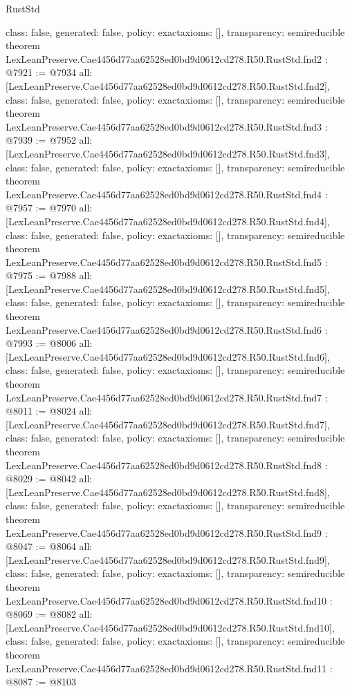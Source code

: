 \begin{lexlean}{RustStd}
\begin{coremodule}
{  class: false,
  generated: false,
  policy: exact{axioms: []},
  transparency: semireducible
}
theorem LexLeanPreserve.Cae4456d77aa62528ed0bd9d0612cd278.R50.RustStd.fnd2 : @7921 := @7934 {
  all: [LexLeanPreserve.Cae4456d77aa62528ed0bd9d0612cd278.R50.RustStd.fnd2],
  class: false,
  generated: false,
  policy: exact{axioms: []},
  transparency: semireducible
}
theorem LexLeanPreserve.Cae4456d77aa62528ed0bd9d0612cd278.R50.RustStd.fnd3 : @7939 := @7952 {
  all: [LexLeanPreserve.Cae4456d77aa62528ed0bd9d0612cd278.R50.RustStd.fnd3],
  class: false,
  generated: false,
  policy: exact{axioms: []},
  transparency: semireducible
}
theorem LexLeanPreserve.Cae4456d77aa62528ed0bd9d0612cd278.R50.RustStd.fnd4 : @7957 := @7970 {
  all: [LexLeanPreserve.Cae4456d77aa62528ed0bd9d0612cd278.R50.RustStd.fnd4],
  class: false,
  generated: false,
  policy: exact{axioms: []},
  transparency: semireducible
}
theorem LexLeanPreserve.Cae4456d77aa62528ed0bd9d0612cd278.R50.RustStd.fnd5 : @7975 := @7988 {
  all: [LexLeanPreserve.Cae4456d77aa62528ed0bd9d0612cd278.R50.RustStd.fnd5],
  class: false,
  generated: false,
  policy: exact{axioms: []},
  transparency: semireducible
}
theorem LexLeanPreserve.Cae4456d77aa62528ed0bd9d0612cd278.R50.RustStd.fnd6 : @7993 := @8006 {
  all: [LexLeanPreserve.Cae4456d77aa62528ed0bd9d0612cd278.R50.RustStd.fnd6],
  class: false,
  generated: false,
  policy: exact{axioms: []},
  transparency: semireducible
}
theorem LexLeanPreserve.Cae4456d77aa62528ed0bd9d0612cd278.R50.RustStd.fnd7 : @8011 := @8024 {
  all: [LexLeanPreserve.Cae4456d77aa62528ed0bd9d0612cd278.R50.RustStd.fnd7],
  class: false,
  generated: false,
  policy: exact{axioms: []},
  transparency: semireducible
}
theorem LexLeanPreserve.Cae4456d77aa62528ed0bd9d0612cd278.R50.RustStd.fnd8 : @8029 := @8042 {
  all: [LexLeanPreserve.Cae4456d77aa62528ed0bd9d0612cd278.R50.RustStd.fnd8],
  class: false,
  generated: false,
  policy: exact{axioms: []},
  transparency: semireducible
}
theorem LexLeanPreserve.Cae4456d77aa62528ed0bd9d0612cd278.R50.RustStd.fnd9 : @8047 := @8064 {
  all: [LexLeanPreserve.Cae4456d77aa62528ed0bd9d0612cd278.R50.RustStd.fnd9],
  class: false,
  generated: false,
  policy: exact{axioms: []},
  transparency: semireducible
}
theorem LexLeanPreserve.Cae4456d77aa62528ed0bd9d0612cd278.R50.RustStd.fnd10 : @8069 := @8082 {
  all: [LexLeanPreserve.Cae4456d77aa62528ed0bd9d0612cd278.R50.RustStd.fnd10],
  class: false,
  generated: false,
  policy: exact{axioms: []},
  transparency: semireducible
}
theorem LexLeanPreserve.Cae4456d77aa62528ed0bd9d0612cd278.R50.RustStd.fnd11 : @8087 := @8103 {
}
\end{coremodule}
\end{lexlean}
